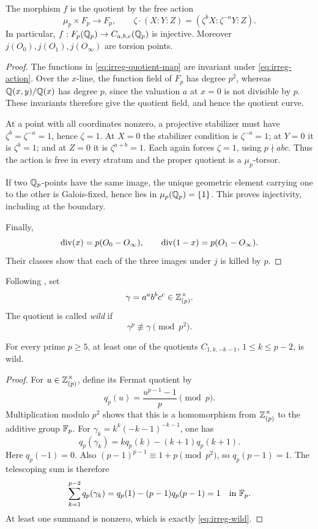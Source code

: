 \begin{lemma}\label{lem:irreg-quotient-free}
The morphism \(f\) is the quotient by the free action
\begin{equation}
 \mu_p\times F_p\longrightarrow F_p,\qquad
 \zeta\cdot(X:Y:Z)=(\zeta^bX:\zeta^{-a}Y:Z).
 \label{eq:irreg-action}
\end{equation}
In particular, \(f:F_p(\mathbb Q_p)\to C_{a,b,c}(\mathbb Q_p)\) is injective.
Moreover \(j(O_0),j(O_1),j(O_\infty)\) are torsion points.
\end{lemma}

\begin{proof}
The functions in \eqref{eq:irreg-quotient-map} are invariant under
\eqref{eq:irreg-action}. Over the \(x\)-line, the function field of
\(F_p\) has degree \(p^2\), whereas
\(\mathbb Q(x,y)/\mathbb Q(x)\) has degree \(p\), since the valuation \(a\) at
\(x=0\) is not divisible by \(p\). These invariants therefore give
the quotient field, and hence the quotient curve.

At a point with all coordinates nonzero, a projective stabilizer
must have \(\zeta^b=\zeta^{-a}=1\), hence \(\zeta=1\).
At \(X=0\) the stabilizer condition is \(\zeta^{-a}=1\);
at \(Y=0\) it is \(\zeta^b=1\); and at \(Z=0\) it is
\(\zeta^{a+b}=1\). Each again forces \(\zeta=1\), using
\(p\nmid abc\). Thus the action is free in every stratum and the
proper quotient is a \(\mu_p\)-torsor.

If two \(\mathbb Q_p\)-points have the same image, the unique geometric
element carrying one to the other is Galois-fixed, hence lies in
\(\mu_p(\mathbb Q_p)=\{1\}\). This proves injectivity, including at the
boundary.

Finally,
\[
 \operatorname{div}(x)=p(O_0-O_\infty),\qquad
 \operatorname{div}(1-x)=p(O_1-O_\infty).
\]
Their classes show that each of the three images under \(j\) is
killed by \(p\).
\end{proof}

Following \cite[pp.~395--398]{McCallum2001Brauer}, set
\[
 \gamma=a^a b^b c^c\in\mathbb Z_{(p)}^\times.
\]
The quotient is called \emph{wild} if
\begin{equation}
 \gamma^p\not\equiv\gamma\pmod{p^2}.
 \label{eq:irreg-wild}
\end{equation}

\begin{lemma}\label{lem:irreg-wild-exists}
For every prime \(p\geq5\), at least one of the quotients
\(C_{1,k,-k-1}\), \(1\leq k\leq p-2\), is wild.
\end{lemma}

\begin{proof}
For \(u\in\mathbb Z_{(p)}^\times\), define its Fermat quotient by
\[
 q_p(u)=\frac{u^{p-1}-1}{p}\pmod p.
\]
Multiplication modulo \(p^2\) shows that this is a homomorphism
from \(\mathbb Z_{(p)}^\times\) to the additive group \(\mathbb F_p\).
For \(\gamma_k=k^k(-k-1)^{-k-1}\), one has
\[
 q_p(\gamma_k)=kq_p(k)-(k+1)q_p(k+1).
\]
Here \(q_p(-1)=0\). Also
\((p-1)^{p-1}\equiv1+p\pmod{p^2}\), so \(q_p(p-1)=1\).
The telescoping sum is therefore
\[
 \sum_{k=1}^{p-2}q_p(\gamma_k)
   =q_p(1)-(p-1)q_p(p-1)=1\quad\text{in }\mathbb F_p.
\]
At least one summand is nonzero, which is exactly
\eqref{eq:irreg-wild}.
\end{proof}

